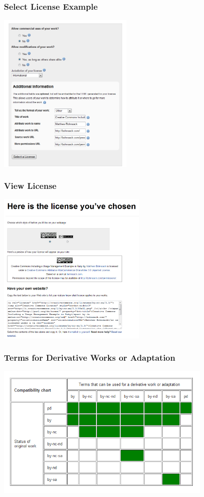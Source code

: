 \documentclass[mathserif,xcolor=dvipsnames,hyperref={bookmarks=true}]{beamer}
\begin{document}
    \begin{frame}[t]
        \frametitle{Select License Example}
        \begin{center}
          \includegraphics[width=0.5\textwidth]{figures/selectlicense.png}
        \end{center}
    \end{frame}

    \begin{frame}[t]
        \frametitle{View License}
        \begin{center}
          \includegraphics[width=0.55\textwidth]{figures/hereislicense.png}
        \end{center}
    \end{frame}

    \begin{frame}[t]
        \frametitle{Terms for Derivative Works or Adaptation}
        \begin{center}
          \includegraphics[width=0.8\textwidth]{figures/terms_for_derivative_work_or_adaptation.png}
        \end{center}
    \end{frame}
\end{document}
